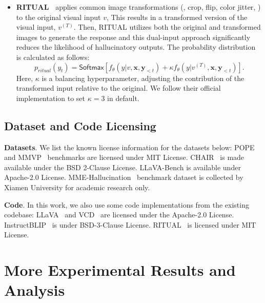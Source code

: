 \begin{itemize}
\item \textbf{RITUAL~\citep{woo2024ritual}} applies common image transformations (\eg, crop, flip, color jitter, \etc) to the original visual input $v$,
This results in a transformed version of the visual input, $v^{(T)}$. Then,  RITUAL utilizes both the original and transformed images to generate the response and this dual-input approach significantly reduces the likelihood of hallucinatory outputs.
The probability distribution is calculated as follows:
\begin{equation}
p_{ritual}\left(y_t\right) =\mathsf{Softmax}\left[f_\theta\left(y | v, \mathbf{x}, \mathbf{y}_{<t}\right) +\kappa f_\theta\left(y | v^{(T)}, \mathbf{x}, \mathbf{y}_{<t}\right)\right].
\label{eq:ritual_sampling}
\end{equation}
Here, $\kappa$ is a balancing hyperparameter, adjusting the contribution of the transformed input relative to the original. We follow their official implementation to set $\kappa=3$ in default.

\end{itemize}

\subsection{Dataset and Code Licensing}
\textbf{Datasets}. We list the known license information for the datasets below: POPE~\citep{li2023evaluating} and MMVP~\citep{tong2024eyes} benchmarks are licensed under MIT License.
CHAIR~\citep{rohrbach2018object} is made available under the BSD 2-Clause License.
LLaVA-Bench is available under Apache-2.0 License.
MME-Hallucination~\citep{fu2023mme} benchmark dataset is collected by Xiamen University for academic research only.

\textbf{Code}. In this work, we also use some code implementations from the existing codebase: LLaVA~\citep{liu2023visual} and VCD~\citep{leng2024mitigating} are licensed under the Apache-2.0 License.
InstructBLIP~\citep{dai2024instructblip} is under BSD-3-Clause License.  RITUAL~\citep{woo2024ritual} is licensed under MIT License.

\section{More Experimental Results and Analysis}
\label{sec:moreablation}




